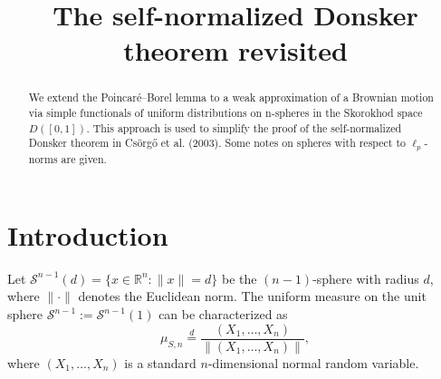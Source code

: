 \documentclass[numbers,compress,v1.0.1]{vmsta}
\theoremstyle{definition}
\def\R{\mathbb{R}}
\begin{document}
%
\begin{frontmatter}

\title{The self-normalized Donsker theorem revisited}

\author{}
\address{University of Mannheim, Institute of Mathematics A5,6, D-68131~Mannheim,~Germany}


\begin{abstract}
We extend the Poincar\'{e}--Borel lemma to a weak approximation of a
Brownian motion via simple functionals of uniform distributions on
n-spheres in the Skorokhod space $D([0,1])$. This approach is used to
simplify the proof of the self-normalized Donsker theorem in Cs\"org\H
{o} et al. (2003). Some notes on spheres with respect to $\ell_p$-norms
are given.
\end{abstract}

\begin{keywords}
\end{keywords}
%
\begin{keywords}[2010]
\end{keywords}



\end{frontmatter}

\section{Introduction}

Let $\mathcal{S}^{n-1}(d) = \{x \in\R^{n}: \|x\|=d\}$
be the $(n-1)$-sphere with radius $d$, where $\|\cdot\|$ denotes the
Euclidean norm. The uniform measure on the unit sphere $\mathcal
{S}^{n-1} := \mathcal{S}^{n-1}(1)$ can be characterized as
%
\begin{equation}
\label{eq:UnifSphereMeas} \mu_{S,n} \stackrel{d} {=} \frac{(X_1,\ldots, X_n)}{\|(X_1,\ldots, X_n)\|},
\end{equation}
%
where $(X_1,\ldots, X_n)$ is a standard $n$-dimensional normal random variable.
\end{document}
